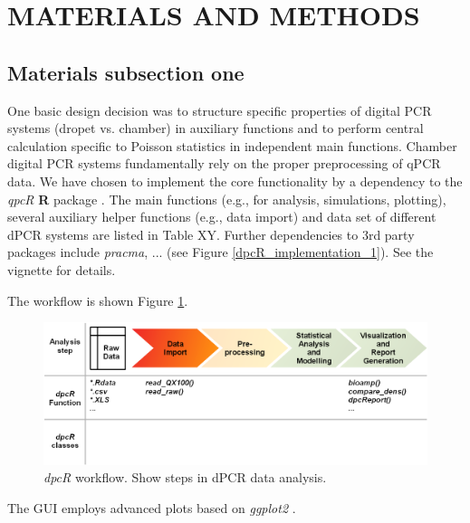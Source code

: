 \documentclass[a4,center,fleqn]{NAR}
\begin{document}
\section{MATERIALS AND METHODS}

\subsection{Materials subsection one}

One basic design decision was to structure specific properties of digital PCR 
systems (dropet vs. chamber) in auxiliary functions and to perform central 
calculation specific to Poisson statistics in independent main functions. 
Chamber digital PCR systems fundamentally rely on the proper preprocessing of 
qPCR data. We have chosen to implement the core functionality by a dependency to 
the \textit{qpcR} \textbf{R} package \cite{ritz_qpcr_2008}. The main functions (e.g., for analysis, 
simulations, plotting), several auxiliary helper functions (e.g., data import) 
and data set of different dPCR systems are listed in Table XY. Further 
dependencies to 3rd party packages include \textit{pracma}, ... (see Figure \ref{dpcR_implementation_1}). See the vignette for 
details.

The workflow is shown Figure \ref{workflow}.

\begin{figure}[t]
\begin{center}
\includegraphics[width=17cm]{workflow.png}
\end{center}
\caption{\textit{dpcR} workflow. Show steps in dPCR data analysis.} 
\label{workflow}
\end{figure}

The GUI employs advanced plots based on \textit{ggplot2} \cite{kahle_wickham_2013}.
\end{document}
